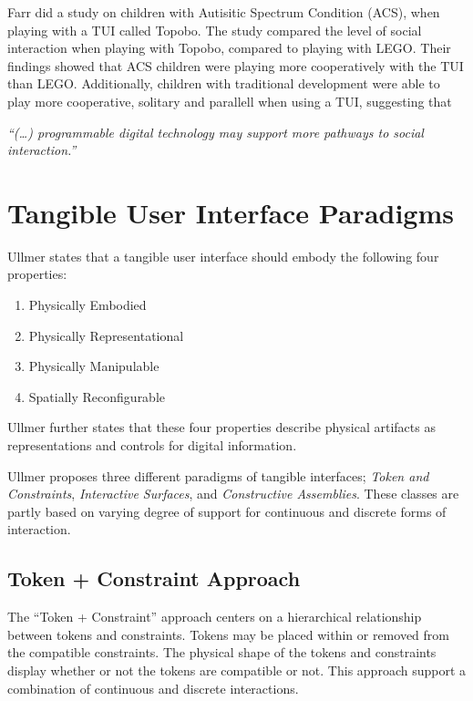 Farr \etal{} did a study on children with Autisitic Spectrum Condition (ACS), when playing with a TUI called Topobo\cite{farr2010social}. The study compared the level of social interaction when playing with Topobo, compared to playing with LEGO. Their findings showed that ACS children were playing more cooperatively with the TUI than LEGO. Additionally, children with traditional development were able to play more cooperative, solitary and parallell when using a TUI, suggesting that 

\textit{``(\ldots) programmable digital technology may support more pathways to social interaction.''}

\section{Tangible User Interface Paradigms}
Ullmer states that a tangible user interface should embody the following four properties\cite{ullmer2002tangible}:

\begin{enumerate}
	\item{Physically Embodied}
	\item{Physically Representational}
	\item{Physically Manipulable}
	\item{Spatially Reconfigurable}
\end{enumerate}

Ullmer further states that these four properties describe physical artifacts as representations and controls for digital information. 

Ullmer proposes three different paradigms of tangible interfaces; \emph{Token and Constraints}, \emph{Interactive Surfaces}, and \emph{Constructive Assemblies}. These classes are partly based on varying degree of support for continuous and discrete forms of interaction\cite{ullmer2002tangible}.

\subsection{Token + Constraint Approach}
\label{sec:tokenandconstraint}
The ``Token + Constraint'' approach centers on a hierarchical relationship between tokens and constraints. Tokens may be placed within or removed from the compatible constraints. The physical shape of the tokens and constraints display whether or not the tokens are compatible or not. This approach support a combination of continuous and discrete interactions.

